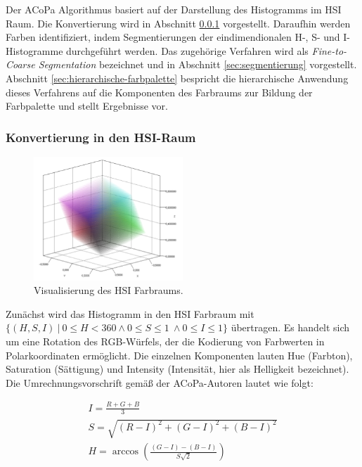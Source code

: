 Der ACoPa Algorithmus \citep{acopa} basiert auf der Darstellung des Histogramms im HSI Raum. Die Konvertierung wird in Abschnitt \ref{sec:hsi-raum} vorgestellt. Daraufhin werden Farben identifiziert, indem Segmentierungen der eindimendionalen H-, S- und I-Histogramme durchgeführt werden. Das zugehörige Verfahren wird als \emph{Fine-to-Coarse Segmentation} bezeichnet und in Abschnitt \ref{sec:segmentierung} vorgestellt. Abschnitt \ref{sec:hierarchische-farbpalette} bespricht die hierarchische Anwendung dieses Verfahrens auf die Komponenten des Farbraums zur Bildung der Farbpalette und stellt Ergebnisse vor.

\subsubsection{Konvertierung in den HSI-Raum}
\label{sec:hsi-raum}

\begin{figure}
\centering
\includegraphics[width=0.5\textwidth]{img/hsi_conversion.png}
\caption{Visualisierung des HSI Farbraums.}
\label{fig:hsi_conversion}
\end{figure}


Zunächst wird das Histogramm in den HSI Farbraum mit $\{(H, S, I) \ | \ 0 \leq H < 360 \wedge 0 \leq S \leq 1\ \land 0 \leq I \leq 1\}$ übertragen. Es handelt sich um eine Rotation des RGB-Würfels, der die Kodierung von Farbwerten in Polarkoordinaten ermöglicht. Die einzelnen Komponenten lauten Hue (Farbton), Saturation (Sättigung) und Intensity (Intensität, hier als Helligkeit bezeichnet). Die Umrechnungsvorschrift gemäß der ACoPa-Autoren lautet wie folgt:

\begin{equation}
\begin{split}
I = \frac{R+G+B}{3} \\
S = \sqrt{(R-I)^2 + (G-I)^2 + (B-I)^2} \\  
H = \arccos{(\frac{(G-I)-(B-I)}{S\sqrt{2}})}
\end{split}
\label{eq:hsi_acopa}
\end{equation}


